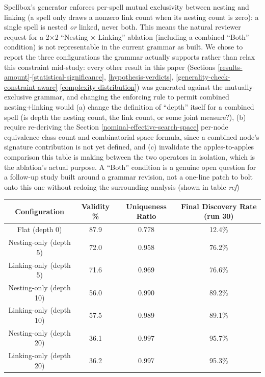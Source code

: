 \documentclass[]{article}
\begin{document}
        Spellbox's generator enforces per-spell mutual exclusivity between nesting and linking (a spell only draws a nonzero link count when its nesting count is zero): a single spell is nested \textit{or} linked, never both. This means the natural reviewer request for a 2×2 ``Nesting × Linking'' ablation (including a combined ``Both'' condition) is not representable in the current grammar as built. We chose to report the three configurations the grammar actually supports rather than relax this constraint mid-study: every other result in this paper (Sections \ref{results-amount}-\ref{statistical-significance}, \ref{hypothesis-verdicts}, \ref{generality-check-constraint-aware}-\ref{complexity-distribution}) was generated against the mutually-exclusive grammar, and changing the enforcing rule to permit combined nesting+linking would (a) change the definition of ``depth'' itself for a combined spell (is depth the nesting count, the link count, or some joint measure?), (b) require re-deriving the Section \ref{nominal-effective-search-space} per-node equivalence-class count and combinatorial space formula, since a combined node's signature contribution is not yet defined, and (c) invalidate the apples-to-apples comparison this table is making between the two operators in isolation, which is the ablation's actual purpose. A ``Both'' condition is a genuine open question for a follow-up study built around a grammar revision, not a one-line patch to bolt onto this one without redoing the surrounding analysis (shown in table \textit{ref})

        \begin{table}[]
            \centering
            \begin{tabularx}{\linewidth}{C C C C}
                \hline
                Configuration & Validity \% & Uniqueness Ratio & Final Discovery Rate (run 30) \\
                \hline
                Flat (depth 0) & 87.9 & 0.778 & 12.4\% \\
                Nesting-only (depth 5) & 72.0 & 0.958 & 76.2\% \\
                Linking-only (depth 5) & 71.6 & 0.969 & 76.6\% \\
                Nesting-only (depth 10) & 56.0 & 0.990 & 89.2\% \\
                Linking-only (depth 10) & 57.5 & 0.989 & 89.1\% \\
                Nesting-only (depth 20) & 36.1 & 0.997 & 95.7\% \\
                Linking-only (depth 20) & 36.2 & 0.997 & 95.3\% \\
                \hline
            \end{tabularx}
            \label{tab:ablation}
        \end{table}
        
\end{document}
